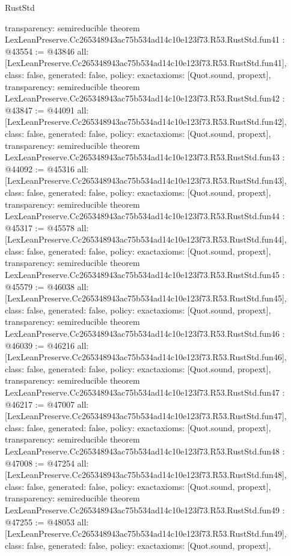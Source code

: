 \begin{lexlean}{RustStd}
\begin{coremodule}
{  transparency: semireducible
}
theorem LexLeanPreserve.Cc265348943ac75b534ad14c10e123f73.R53.RustStd.fun41 : @43554 := @43846 {
  all: [LexLeanPreserve.Cc265348943ac75b534ad14c10e123f73.R53.RustStd.fun41],
  class: false,
  generated: false,
  policy: exact{axioms: [Quot.sound, propext]},
  transparency: semireducible
}
theorem LexLeanPreserve.Cc265348943ac75b534ad14c10e123f73.R53.RustStd.fun42 : @43847 := @44091 {
  all: [LexLeanPreserve.Cc265348943ac75b534ad14c10e123f73.R53.RustStd.fun42],
  class: false,
  generated: false,
  policy: exact{axioms: [Quot.sound, propext]},
  transparency: semireducible
}
theorem LexLeanPreserve.Cc265348943ac75b534ad14c10e123f73.R53.RustStd.fun43 : @44092 := @45316 {
  all: [LexLeanPreserve.Cc265348943ac75b534ad14c10e123f73.R53.RustStd.fun43],
  class: false,
  generated: false,
  policy: exact{axioms: [Quot.sound, propext]},
  transparency: semireducible
}
theorem LexLeanPreserve.Cc265348943ac75b534ad14c10e123f73.R53.RustStd.fun44 : @45317 := @45578 {
  all: [LexLeanPreserve.Cc265348943ac75b534ad14c10e123f73.R53.RustStd.fun44],
  class: false,
  generated: false,
  policy: exact{axioms: [Quot.sound, propext]},
  transparency: semireducible
}
theorem LexLeanPreserve.Cc265348943ac75b534ad14c10e123f73.R53.RustStd.fun45 : @45579 := @46038 {
  all: [LexLeanPreserve.Cc265348943ac75b534ad14c10e123f73.R53.RustStd.fun45],
  class: false,
  generated: false,
  policy: exact{axioms: [Quot.sound, propext]},
  transparency: semireducible
}
theorem LexLeanPreserve.Cc265348943ac75b534ad14c10e123f73.R53.RustStd.fun46 : @46039 := @46216 {
  all: [LexLeanPreserve.Cc265348943ac75b534ad14c10e123f73.R53.RustStd.fun46],
  class: false,
  generated: false,
  policy: exact{axioms: [Quot.sound, propext]},
  transparency: semireducible
}
theorem LexLeanPreserve.Cc265348943ac75b534ad14c10e123f73.R53.RustStd.fun47 : @46217 := @47007 {
  all: [LexLeanPreserve.Cc265348943ac75b534ad14c10e123f73.R53.RustStd.fun47],
  class: false,
  generated: false,
  policy: exact{axioms: [Quot.sound, propext]},
  transparency: semireducible
}
theorem LexLeanPreserve.Cc265348943ac75b534ad14c10e123f73.R53.RustStd.fun48 : @47008 := @47254 {
  all: [LexLeanPreserve.Cc265348943ac75b534ad14c10e123f73.R53.RustStd.fun48],
  class: false,
  generated: false,
  policy: exact{axioms: [Quot.sound, propext]},
  transparency: semireducible
}
theorem LexLeanPreserve.Cc265348943ac75b534ad14c10e123f73.R53.RustStd.fun49 : @47255 := @48053 {
  all: [LexLeanPreserve.Cc265348943ac75b534ad14c10e123f73.R53.RustStd.fun49],
  class: false,
  generated: false,
  policy: exact{axioms: [Quot.sound, propext]},
}
\end{coremodule}
\end{lexlean}
